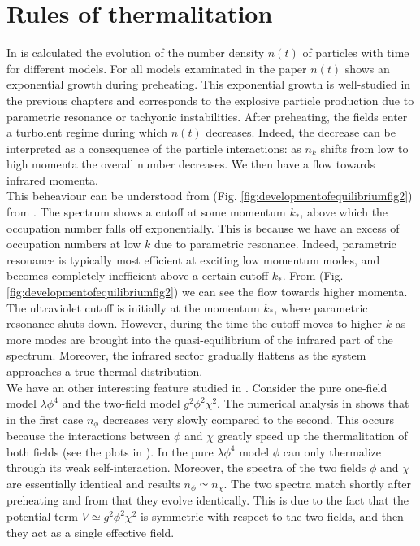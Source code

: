 \documentclass[11pt,a4paper,twoside]{book}
\begin{document}
\section{Rules of thermalitation}
In \cite{Chap6:DevelopmentEquilibrium} is calculated the evolution of  the number density $ n(t) $ of particles with time for different models. For all models examinated in the paper  $ n(t) $  shows an exponential growth during preheating. This exponential growth is well-studied in the previous chapters and corresponds to the explosive particle production due to parametric resonance or tachyonic instabilities. After preheating, the fields enter a turbolent regime during which $ n(t) $ decreases. Indeed, the decrease can be interpreted as a consequence of the particle interactions: as $ n_{k} $ shifts from low to high momenta the overall number decreases. We then have a flow towards infrared momenta.\\
This beheaviour can be understood from (Fig. \ref{fig:developmentofequilibriumfig2}) from \cite{Chap6:DevelopmentEquilibrium}. The spectrum shows a cutoff at some momentum $ k_{*} $, above which the occupation number falls off exponentially.  This is because we have an excess of occupation numbers at low $ k $ due to parametric resonance. Indeed, parametric resonance is typically most efficient at exciting low momentum modes, and becomes completely inefficient above a certain cutoff $ k_{*} $. From (Fig. \ref{fig:developmentofequilibriumfig2}) we can see the flow towards higher momenta. The ultraviolet cutoff is initially at the momentum $ k_{*} $, where parametric resonance shuts down. However, during the time the cutoff moves to higher $ k $ as more modes are brought into the quasi-equilibrium of the infrared part of the spectrum. Moreover, the infrared sector  gradually flattens as the system approaches a true thermal distribution.\\
We have an other interesting feature  studied in \cite{Chap6:DevelopmentEquilibrium}. Consider the pure one-field model $ \lambda \phi^{4} $ and the two-field model $ g^{2}\phi^{2}\chi^{2} $. The numerical analysis in \cite{Chap6:DevelopmentEquilibrium} shows that in the first case $ n_{\phi} $ decreases very slowly compared to the second. This occurs because  the interactions between $\phi$ and $\chi$ greatly speed up the thermalitation of both fields (see the plots in \cite{Chap6:DevelopmentEquilibrium}). In the pure $ \lambda \phi^{4} $ model $\phi$ can only thermalize through its weak self-interaction. Moreover, the spectra of the two fields $\phi$ and $\chi$ are essentially identical and results $ n_{\phi} \simeq n_{\chi} $. The two spectra match shortly after preheating and from that they evolve identically. This is due to the fact that the potential term $ V\simeq g^{2}\phi^{2}\chi^{2} $ is symmetric with respect to the two fields, and then they act as a single effective field.\\
\end{document}
